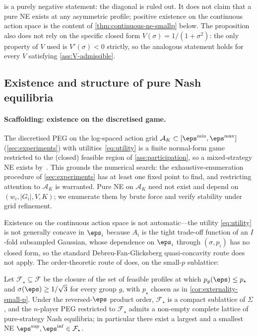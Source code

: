  is a purely negative statement: the diagonal
is ruled out. It does not claim that a pure NE exists at any asymmetric
profile; positive existence on the continuous action space is the content
of \cref{thm:continuous-ne-smallp} below. The proposition also does not
rely on the specific closed form $V(\sigma) = 1/(1+\sigma^2)$: the only
property of $V$ used is $V'(\sigma) < 0$ strictly, so the analogous
statement holds for every $V$ satisfying \cref{ass:V-admissible}.

\subsection{Existence and structure of pure Nash equilibria}
\label{sec:existence}

\paragraph{Scaffolding: existence on the discretised game.}
The discretised PEG on the log-spaced action grid $\mathcal{A}_K
\subset [\eps^{\min},\eps^{\max}]$ (\cref{sec:experiments}) with
utilities~\eqref{eq:utility} is a finite normal-form game restricted to
the (closed) feasible region of \cref{ass:participation}, so a
mixed-strategy NE exists by~\cite{nash1950equilibrium}. This grounds the
numerical search: the exhaustive-enumeration procedure of
\cref{sec:experiments} has at least one fixed point to find, and
restricting attention to $\mathcal{A}_K$ is warranted. Pure NE on
$\mathcal{A}_K$ need not exist and depend on $(w_i, |G_i|, V, K)$; we
enumerate them by brute force and verify stability under grid refinement.

Existence on the continuous action space is not automatic---the utility
\eqref{eq:utility} is not generally concave in $\eps_i$ because $A_i$ is
the tight trade-off function of an $I$-fold subsampled Gaussian, whose
dependence on $\eps_i$ through $(\sigma, p_i)$ has no closed form, so the
standard Debreu-Fan-Glicksberg quasi-concavity route does not apply.
The order-theoretic route of \citet{topkis1979equilibrium,
milgrom1990rationalizability} does, on the small-$p$ sublattice:

\begin{theorem}
\label{thm:continuous-ne-smallp}
Let $\mathcal F_\star \subseteq \mathcal F$ be the closure of the set of
feasible profiles at which $p_g(\boldsymbol{\eps}) \leq p_\star$ and
$\sigma(\boldsymbol{\eps}) \geq 1/\sqrt 3$ for every group $g$, with
$p_\star$ chosen as in \cref{cor:externality-small-p}. Under the
reversed-$\eps$ product order, $\mathcal F_\star$ is a compact sublattice
of $\Sigma$, and the $n$-player PEG restricted to $\mathcal F_\star$
admits a non-empty complete lattice of pure-strategy Nash equilibria; in
particular there exist a largest and a smallest NE
$\boldsymbol{\eps}^{\mathrm{sup}}, \boldsymbol{\eps}^{\mathrm{inf}}
\in \mathcal F_\star$.
\end{theorem}

